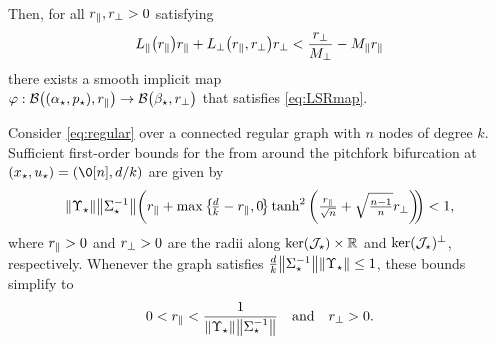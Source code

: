 \documentclass[a4paper]{cas-dc}
\begin{document}
\begin{theorem}
\begin{subequations}
\begin{align}
        \end{align} \label{def:lsr1-L}
    \end{subequations}
    Then, for all \(\rpr,\rpp>0\) satisfying
    \begin{equation}
        \Lpr\rpr + \Lpp\rpp < \frac{\rpp}{\Mpp} - \Mpr\rpr \label{eq:lsr1}
    \end{equation}
    there exists a smooth implicit map \\ \(\varphi : \Bpara[\rpr] \to \Bperp[\rpp]\) that satisfies \eqref{eq:LSRmap}.
\end{theorem}

\begin{theorem}
    \label{thm:lsr1-regular}
    Consider \eqref{eq:regular} over a connected regular graph with \(n\) nodes of degree \(k\). Sufficient first-order bounds for the \LSR{} from  around the pitchfork bifurcation at \((x_{\star},u_{\star})=(\0[n], d/k)\) are given by
    \small
    \begin{equation*}
        \norm{\U}\norm{\s^{-1}}\!\left(\rpr + \max\left\{\!\tfrac{d}{k}-\rpr,0\!\right\}\tanh^2\left(\tfrac{\rpr}{\sqrt{n}} + \sqrt{\tfrac{n-1}{n}}\rpp\right)\!\!\right)<1,
    \end{equation*}
    \normalsize
    where \(\rpr>0\) and \(\rpp>0\) are the radii along \(\ker(\J)\times\R\) and \(\ker(\J)^\perp\), respectively. Whenever the graph satisfies \(\frac{d}{k}\norm{\s^{-1}}\norm{\U} \le 1\), these bounds simplify to
    \begin{equation}
        0<\rpr<\frac{1}{\norm{\U}\norm{\s^{-1}}} \quad\text{and}\quad \rpp>0. \label{eq:decouple}
    \end{equation}
\end{theorem}
\end{document}
